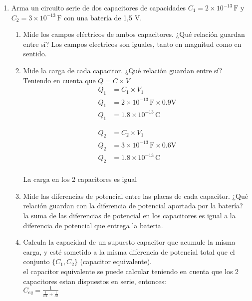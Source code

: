 \documentclass[12pt]{report}
\begin{document}
\begin{enumerate}
    \item Arma un circuito serie de dos capacitores de capacidades $C_1 = 2 \times 10^{-13} \, \text{F}$ y $C_2 = 3 \times 10^{-13} \, \text{F}$ con una batería de 1,5 V.
    \begin{enumerate}
        \item Mide los campos eléctricos de ambos capacitores. ¿Qué relación guardan entre sí?
            Los campos electricos son iguales, tanto en magnitud como en sentido.
        \item Mide la carga de cada capacitor. ¿Qué relación guardan entre sí?\\
            Teniendo en cuenta que $Q=C \times V$\\
            
            \begin{align*}
            Q_1&= C_1 \times V_1\\[6pt]
            Q_1&= 2 \times 10^{-13} \,\text{F} \times 0.9 \text{V}\\[6pt]
            Q_1&= 1.8\times 10^{-13} \,\text{C}
            \end{align*}


            \begin{align*}
            Q_2&= C_2 \times V_1\\[6pt]
            Q_2&= 3 \times 10^{-13} \,\text{F} \times 0.6 \text{V}\\[6pt]
            Q_2&= 1.8\times 10^{-13} \,\text{C}\\[12pt]
            \end{align*}
       
            La carga en los 2 capacitores es igual


        \item Mide las diferencias de potencial entre las placas de cada capacitor. ¿Qué relación guardan con la diferencia de potencial aportada por la batería?\\
            la suma de las diferencias de potencial en los capacitores es igual a la diferencia de potencial que entrega la bateria.\\
        \item Calcula la capacidad de un supuesto capacitor que acumule la misma carga, y esté sometido a la misma diferencia de potencial total que el conjunto $\{C_1, C_2\}$ (capacitor equivalente).\\
            el capacitor equivalente se puede calcular teniendo en cuenta que los 2 capacitores estan dispuestos en serie, entonces:\\
            $C_{eq}= \frac{1}{\frac{1}{C1}+\frac{1}{c2}}$\\


\end{enumerate}
\end{enumerate}
\end{document}
